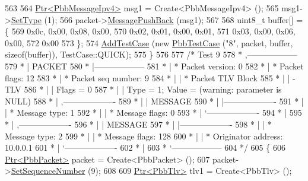 \begin{DoxyCode}
563 
564     \hyperlink{classns3_1_1Ptr}{Ptr<PbbMessageIpv4>} msg1 = Create<PbbMessageIpv4> ();
565     msg1->\hyperlink{classns3_1_1PbbMessage_a4b3d1eaabd3e7412a46ac79bf3360dac}{SetType} (1);
566     packet->\hyperlink{classns3_1_1PbbPacket_a4a3170001ef758d9c9c4375b8f089826}{MessagePushBack} (msg1);
567 
568     uint8\_t buffer[] = \{
569       0x0c, 0x00, 0x08, 0x00,
570       0x02, 0x01, 0x00, 0x01,
571       0x03, 0x00, 0x06, 0x00,
572       0x00
573     \};
574     \hyperlink{classns3_1_1TestCase_a3718088e3eefd5d6454569d2e0ddd835}{AddTestCase} (\textcolor{keyword}{new} \hyperlink{classPbbTestCase}{PbbTestCase} (\textcolor{stringliteral}{"8"}, packet, buffer, \textcolor{keyword}{sizeof}(buffer)), 
      TestCase::QUICK);
575   \}
576 
577   \textcolor{comment}{/* Test 9}
578 \textcolor{comment}{         * ,------------------}
579 \textcolor{comment}{         * |  PACKET}
580 \textcolor{comment}{         * |------------------}
581 \textcolor{comment}{         * | * Packet version:    0}
582 \textcolor{comment}{         * | * Packet flags:  12}
583 \textcolor{comment}{         * | * Packet seq number: 9}
584 \textcolor{comment}{         * |    | * Packet TLV Block}
585 \textcolor{comment}{         * |    |     - TLV}
586 \textcolor{comment}{         * |    |         Flags = 0}
587 \textcolor{comment}{         * |    |         Type = 1; Value = (warning: parameter is NULL)}
588 \textcolor{comment}{         * |    ,-------------------}
589 \textcolor{comment}{         * |    |  MESSAGE}
590 \textcolor{comment}{         * |    |-------------------}
591 \textcolor{comment}{         * |    | * Message type:       1}
592 \textcolor{comment}{         * |    | * Message flags:  0}
593 \textcolor{comment}{         * |    `-------------------}
594 \textcolor{comment}{         * |}
595 \textcolor{comment}{         * |    ,-------------------}
596 \textcolor{comment}{         * |    |  MESSAGE}
597 \textcolor{comment}{         * |    |-------------------}
598 \textcolor{comment}{         * |    | * Message type:       2}
599 \textcolor{comment}{         * |    | * Message flags:  128}
600 \textcolor{comment}{         * |    | * Originator address: 10.0.0.1}
601 \textcolor{comment}{         * |    `-------------------}
602 \textcolor{comment}{         * |}
603 \textcolor{comment}{         * `------------------}
604 \textcolor{comment}{  */}
605   \{
606     \hyperlink{classns3_1_1Ptr}{Ptr<PbbPacket>} packet = Create<PbbPacket> ();
607     packet->\hyperlink{classns3_1_1PbbPacket_a7d6a1602be86109760d0f26ff9bbbb8e}{SetSequenceNumber} (9);
608 
609     \hyperlink{classns3_1_1Ptr}{Ptr<PbbTlv>} tlv1 = Create<PbbTlv> ();

\end{DoxyCode}
